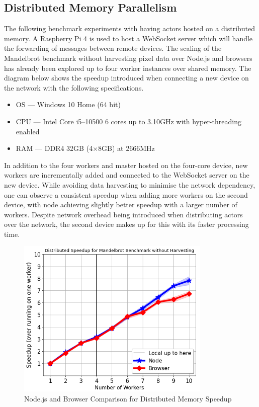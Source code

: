 \documentclass[oneside]{um-fict}
\begin{document}
\subsection{Distributed Memory Parallelism}
The following benchmark experiments with having actors hosted on a distributed memory. A Raspberry Pi 4 is used to host a WebSocket server which will handle the forwarding of messages between remote devices. The scaling of the Mandelbrot benchmark without harvesting pixel data over Node.js and browsers has already been explored up to four worker instances over shared memory. The diagram below shows the speedup introduced when connecting a new device on the network with the following specifications.
\begin{itemize}
    \item OS --- Windows 10 Home (64 bit)
    \item CPU --- Intel Core i5--10500 6 cores up to 3.10GHz with hyper-threading enabled
    \item RAM --- DDR4 32GB (4$\times$8GB) at 2666MHz
\end{itemize}
In addition to the four workers and master hosted on the four-core device, new workers are incrementally added and connected to the WebSocket server on the new device. While avoiding data harvesting to minimise the network dependency, one can observe a consistent speedup when adding more workers on the second device, with node achieving slightly better speedup with a larger number of workers. Despite network overhead being introduced when distributing actors over the network, the second device makes up for this with its faster processing time.
\begin{figure}[H]
    \begin{centering}
        \includegraphics[width=350px]{resources/distributed_memory_speedup.png}
        \caption{Node.js and Browser Comparison for Distributed Memory Speedup}\label{fig:distributed_memory_speedup}
    \end{centering}
\end{figure}
\end{document}
